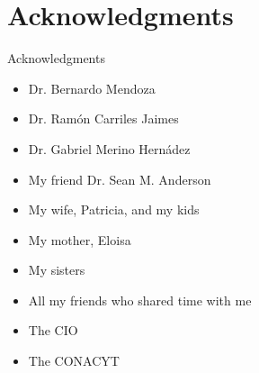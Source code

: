 \documentclass{beamer}
\begin{document}
\section{Acknowledgments} 

\begin{frame}

\begin{center}
    
{\Large Acknowledgments}

\begin{itemize}
\item Dr. Bernardo Mendoza
\item Dr. Ram\'on Carriles Jaimes
\item Dr. Gabriel Merino Hern\'adez
\item My friend Dr. Sean M. Anderson
\item My wife, Patricia, and my kids 
\item My mother, Eloisa
\item My sisters
\item All my friends who shared time with me
\item The CIO
\item The CONACYT
\end{itemize}

\end{center}

\end{frame}


{
\begin{frame}
\end{frame}
}

\begin{frame}

\end{frame}


\begin{frame}[noframenumbering]


\end{frame}
\end{document}
